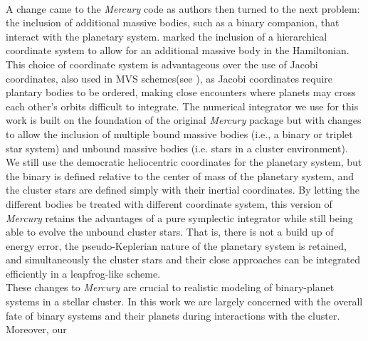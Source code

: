 \documentclass{aastex631}
\begin{document}
 \\
\indent A change came to the \textit{Mercury} code as authors \citep{cha02} then turned to the next problem: the inclusion of additional massive bodies, such as a 
binary companion, that interact with the planetary system. \cite{cha02} marked the inclusion of a hierarchical coordinate system
to allow for an additional massive body in the Hamiltonian. This choice of coordinate system is advantageous over the use of Jacobi coordinates, also used in MVS schemes(see 
\cite{beu03}),
as Jacobi coordinates require plantary bodies to be ordered, making close encounters where planets may cross each other's orbits difficult to integrate. 
The numerical integrator we use for this work is built on the foundation of the original \textit{Mercury} package but with changes
to allow the inclusion of multiple bound massive bodies (i.e., a binary or triplet star system) and unbound massive bodies (i.e. stars in a cluster environment)\citep{kai17}.
We still use the democratic heliocentric coordinates for the planetary system, but the binary
is defined relative to the center of mass of the planetary system, and the cluster stars are defined simply with their inertial coordinates. By letting the different
bodies be treated with different coordinate system, this version of \textit{Mercury} retains the advantages of a pure symplectic integrator while still being able 
to evolve the unbound cluster stars. That is, there is not a build up of energy error, the pseudo-Keplerian nature of the planetary system 
is retained, and simultaneously the cluster stars and their close approaches can be integrated efficiently in a leapfrog-like scheme. \\
\indent These changes to \textit{Mercury} are crucial to realistic modeling of binary-planet systems in a stellar cluster.
 In this work we are largely concerned with the overall fate of binary systems and their planets during interactions with the cluster. Moreover, our
\end{document}
